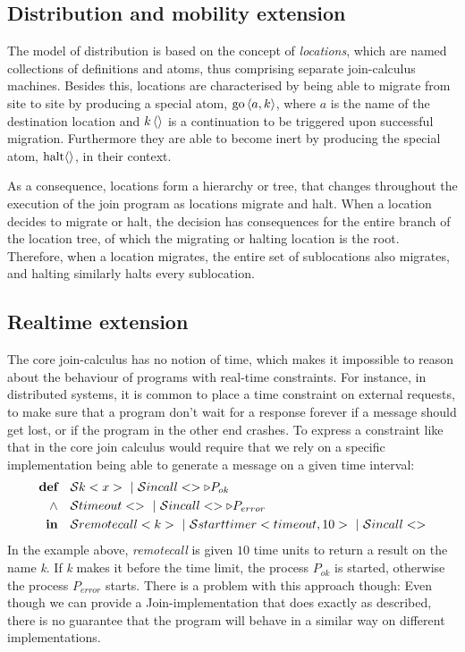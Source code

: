 \subsection{Distribution and mobility extension}
The model of distribution is based on the concept of \emph{locations}, which
are named collections of definitions and atoms, thus comprising separate
join-calculus machines. Besides this, locations are characterised by being able
to migrate from site to site by producing a special atom, $\Go<a,k>$, where $a$
is the name of the destination location and $\atm k <>$ is a continuation to be
triggered upon successful migration. Furthermore they are able to become inert
by producing the special atom, $\Halt<>$, in their context.

As a consequence, locations form a hierarchy or tree, that changes throughout
the execution of the join program as locations migrate and halt.
When a location decides to migrate or halt, the decision has consequences for
the entire branch of the location tree, of which the migrating or halting
location is the root. Therefore, when a location migrates, the entire set of
sublocations also migrates, and halting similarly halts every sublocation.

\subsection{Realtime extension}

The core join-calculus has no notion of time, which makes it
impossible to reason about the behaviour of programs with real-time
constraints.  For instance, in distributed systems, it is common to
place a time constraint on external requests, to make sure that a
program don't wait for a response forever if a message should get
lost, or if the program in the other end crashes. To express a
constraint like that in the core join calculus would require that we
rely on a specific implementation being able to generate a message on
a given time interval:
\begin{align*}
  \textbf{def}\quad & \S k<x> ~|~ \S incall<> \triangleright P_{ok} \\
  \land\quad & \S timeout<> ~|~ \S incall<> \triangleright P_{error} \\
  \textbf{in}\quad & \S remotecall<k> ~|~ \S starttimer<timeout, 10>
                                      ~|~ \S incall<>
\end{align*}
In the example above, \emph{remotecall} is given $10$ time units to
return a result on the name \emph{k}. If \emph{k} makes it before the
time limit, the process $P_{ok}$ is started, otherwise the process
$P_{error}$ starts.  There is a problem with this approach though:
Even though we can provide a Join-implementation that does exactly as
described, there is no guarantee that the program will behave in a
similar way on different implementations.

